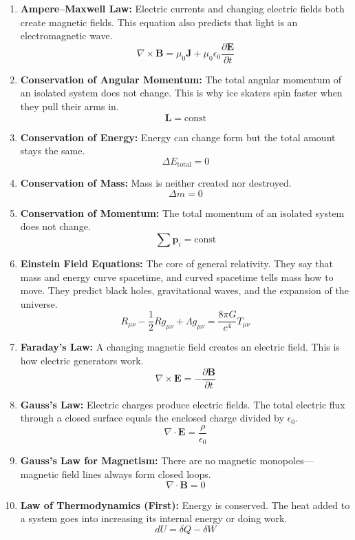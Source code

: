\begin{enumerate}

\item \textbf{Ampere--Maxwell Law:} Electric currents and changing electric fields both create magnetic fields. This equation also predicts that light is an electromagnetic wave.
\[
\nabla\times\mathbf B=\mu_0\mathbf J+\mu_0\epsilon_0\frac{\partial\mathbf E}{\partial t}
\]

\item \textbf{Conservation of Angular Momentum:} The total angular momentum of an isolated system does not change. This is why ice skaters spin faster when they pull their arms in.
\[
\mathbf L=\text{const}
\]

\item \textbf{Conservation of Energy:} Energy can change form but the total amount stays the same.
\[
\Delta E_{\text{total}}=0
\]

\item \textbf{Conservation of Mass:} Mass is neither created nor destroyed.
\[
\Delta m=0
\]

\item \textbf{Conservation of Momentum:} The total momentum of an isolated system does not change.
\[
\sum\mathbf p_i=\text{const}
\]

\item \textbf{Einstein Field Equations:} The core of general relativity. They say that mass and energy curve spacetime, and curved spacetime tells mass how to move. They predict black holes, gravitational waves, and the expansion of the universe.
\[
R_{\mu\nu}-\frac12Rg_{\mu\nu}+\Lambda g_{\mu\nu}
=\frac{8\pi G}{c^4}T_{\mu\nu}
\]

\item \textbf{Faraday's Law:} A changing magnetic field creates an electric field. This is how electric generators work.
\[
\nabla\times\mathbf E=-\frac{\partial\mathbf B}{\partial t}
\]

\item \textbf{Gauss's Law:} Electric charges produce electric fields. The total electric flux through a closed surface equals the enclosed charge divided by $\epsilon_0$.
\[
\nabla\cdot\mathbf E=\frac{\rho}{\epsilon_0}
\]

\item \textbf{Gauss's Law for Magnetism:} There are no magnetic monopoles---magnetic field lines always form closed loops.
\[
\nabla\cdot\mathbf B=0
\]

\item \textbf{Law of Thermodynamics (First):} Energy is conserved. The heat added to a system goes into increasing its internal energy or doing work.
\[
dU=\delta Q-\delta W
\]


\end{enumerate}

